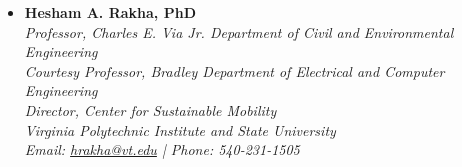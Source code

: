 \documentclass[letterpaper,11pt]{article}
\begin{document}
\begin{itemize}
    \item \textbf{Hesham A. Rakha, PhD} \\
    {\small \textit{Professor, Charles E. Via Jr. Department of Civil and Environmental Engineering}} \\ 
    {\small \textit{Courtesy Professor, Bradley Department of Electrical and Computer Engineering}} \\ 
    {\small \textit{Director, Center for Sustainable Mobility}} \\
    {\small \textit{Virginia Polytechnic Institute and State University}} \\
    {\small \textit{Email: \href{mailto:hrakha@vt.edu}{hrakha@vt.edu} | Phone: 540-231-1505}}
\end{itemize}
\end{document}
